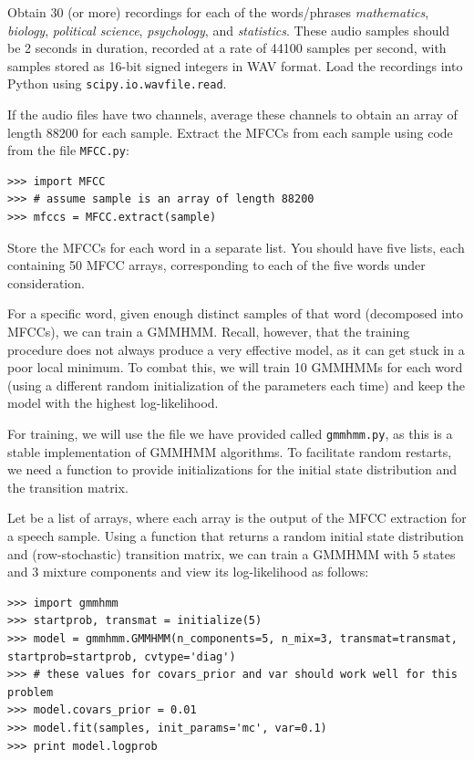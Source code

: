 \begin{problem}
Obtain $30$ (or more) recordings for each of the words/phrases \emph{mathematics}, \emph{biology}, \emph{political science}, \emph{psychology}, and \emph{statistics}.
These audio samples should be 2 seconds in duration, recorded at a rate of 44100 samples per second, with samples stored as 16-bit signed integers in WAV format.
Load the recordings into Python using {\tt scipy.io.wavfile.read}.

If the audio files have two channels, average these channels to obtain an array of length $88200$ for each sample.
Extract the MFCCs from each sample using code from the file {\tt MFCC.py}:
\begin{lstlisting}
>>> import MFCC
>>> # assume sample is an array of length 88200
>>> mfccs = MFCC.extract(sample)
\end{lstlisting}
Store the MFCCs for each word in a separate list. You should have five lists, each containing 50 MFCC arrays, corresponding to each of the five words
under consideration.
\end{problem}

For a specific word, given enough distinct samples of that word (decomposed into MFCCs), we can train a GMMHMM.
Recall, however, that the training procedure does not always produce a very effective model, as it can get stuck in a poor local minimum. 
To combat this, we will train 10 GMMHMMs for each word (using a different random initialization of the parameters each time)
and keep the model with the highest log-likelihood.

For training, we will use the file we have provided called {\tt gmmhmm.py}, as this is a stable implementation of GMMHMM algorithms.
To facilitate random restarts, we need a function to provide initializations for the initial state distribution and the transition matrix.

Let  be a list of arrays, where each array is the output of the MFCC extraction for a speech sample.
Using a function  that returns a random initial state distribution and (row-stochastic) transition matrix, we can train a GMMHMM with $5$ states
and $3$ mixture components and view its log-likelihood as follows:
\begin{lstlisting}
>>> import gmmhmm
>>> startprob, transmat = initialize(5)
>>> model = gmmhmm.GMMHMM(n_components=5, n_mix=3, transmat=transmat, startprob=startprob, cvtype='diag')
>>> # these values for covars_prior and var should work well for this problem
>>> model.covars_prior = 0.01
>>> model.fit(samples, init_params='mc', var=0.1)
>>> print model.logprob
\end{lstlisting}

